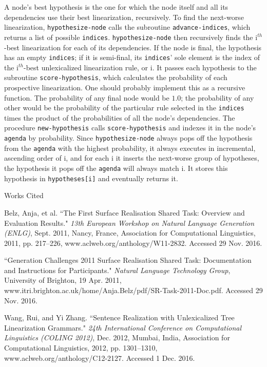 \documentclass[12pt,letterpaper]{article}
\newenvironment{workscited}{
  \newcommand{\bibentry}{\noindent{}\hangindent=0.5in}
  \newpage{}
  {\centering{}Works Cited\par{}}
}{\newpage{}}
\begin{document}
\begin{flushleft}
  A node's best hypothesis is the one for which the node itself and all its dependencies use their best linearization, recursively. To find the next-worse linearization, \texttt{hypothesize-node} calls the subroutine \texttt{advance-indices}, which returns a list of possible \texttt{indices}. \texttt{hypothesize-node} then recursively finds the $\textrm{i}^{th}$-best linearization for each of its dependencies. If the node is final, the hypothesis has an empty \texttt{indices}; if it is semi-final, its \texttt{indices}' sole element is the index of the $\textrm{i}^{th}$-best unlexicalized linearization rule, or $\textrm{i}$. It passes each hypothesis to the subroutine \texttt{score-hypothesis}, which calculates the probability of each prospective linearization. One should probably implement this as a recursive function. The probability of any final node would be $1.0$; the probability of any other would be the probability of the particular rule selected in the \texttt{indices} times the product of the probabilities of all the node's dependencies. The procedure \texttt{new-hypothesis} calls \texttt{score-hypothesis} and indexes it in the node's \texttt{agenda} by probability. Since \texttt{hypothesize-node} always pops off the hypothesis from the \texttt{agenda} with the highest probability, it always executes in incremental, ascending order of $\textrm{i}$, and for each $\textrm{i}$ it inserts the next-worse group of hypotheses, the hypothesis it pops off the \texttt{agenda} will always match $\textrm{i}$. It stores this hypothesis in \texttt{hypotheses[i]} and eventually returns it.
  \begin{workscited}
    \bibentry{}Belz, Anja, et al. ``The First Surface Realisation Shared Task: Overview and Evaluation Results." \textit{13th European Workshop on Natural Language Generation (ENLG)}, Sept. 2011, Nancy, France, Association for Computational Linguistics, 2011, pp. 217--226, www.aclweb.org/anthology/W11-2832. Accessed 29 Nov. 2016.

    \bibentry{}``Generation Challenges 2011 Surface Realisation Shared Task: Documentation and Instructions for Participants." \textit{Natural Language Technology Group}, University of Brighton, 19 Apr. 2011, www.itri.brighton.ac.uk/home/Anja.Belz/pdf/SR-Task-2011-Doc.pdf. Accessed 29 Nov. 2016.

    \bibentry{}Wang, Rui, and Yi Zhang. ``Sentence Realization with Unlexicalized Tree Linearization Grammars." \textit{24th International Conference on Computational Linguistics (COLING 2012)}, Dec. 2012, Mumbai, India, Association for Computational Linguistics, 2012, pp. 1301--1310, www.aclweb.org/anthology/C12-2127. Accessed 1 Dec. 2016.
  \end{workscited}
\end{flushleft}
\end{document}
